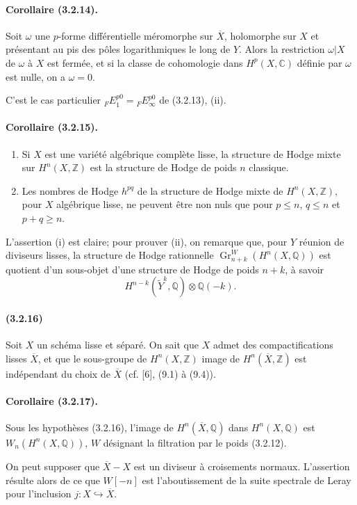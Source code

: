 \documentclass[10pt]{article}
\newcommand{\C}{\mathbb C}
\newcommand{\Q}{\mathbb Q}
\newcommand{\Z}{\mathbb Z}
\newcommand{\Gr}{\operatorname{Gr}}
\begin{document}
\paragraph{Corollaire (3.2.14).} Soit $\omega$ une $p$-forme différentielle méromorphe sur $\overline X$, holomorphe sur $X$ et présentant au pis des pôles logarithmiques le long de $Y$. Alors la restriction $\omega|X$ de $\omega$ à $X$ est fermée, et si la classe de cohomologie dans $H^p(X,\C)$ définie par $\omega$ est nulle, on a $\omega=0$.

C'est le cas particulier ${}_FE_1^{p0}={}_FE_\infty^{p0}$ de (3.2.13), (ii).

\paragraph{Corollaire (3.2.15).} 
\begin{enumerate}[label=(\roman*)]
\item Si $X$ est une variété algébrique complète lisse, la structure de Hodge mixte sur $H^n(X,\Z)$ est la structure de Hodge de poids $n$ classique.
\item Les nombres de Hodge $h^{pq}$ de la structure de Hodge mixte de $H^n(X,\Z)$, pour $X$ algébrique lisse, ne peuvent être non nuls que pour $p\le n$, $q\le n$ et $p+q\ge n$.
\end{enumerate}
L'assertion (i) est claire; pour prouver (ii), on remarque que, pour $Y$ réunion de diviseurs lisses, la structure de Hodge rationnelle $\Gr_{n+k}^W(H^n(X,\Q))$ est quotient d'un sous-objet d'une structure de Hodge de poids $n+k$, à savoir
\[
H^{n-k}(\widetilde Y^k,\Q)\otimes\Q(-k).
\]

\paragraph{(3.2.16)} Soit $X$ un schéma lisse et séparé. On sait que $X$ admet des compactifications lisses $\overline X$, et que le sous-groupe de $H^n(X,\Z)$ image de $H^n(\overline X,\Z)$ est indépendant du choix de $\overline X$ (cf. [6], (9.1) à (9.4)).

\paragraph{Corollaire (3.2.17).} Sous les hypothèses (3.2.16), l'image de $H^n(\overline X,\Q)$ dans $H^n(X,\Q)$ est $W_n(H^n(X,\Q))$, $W$ désignant la filtration par le poids (3.2.12).

On peut supposer que $\overline X-X$ est un diviseur à croisements normaux. L'assertion résulte alors de ce que $W[-n]$ est l'aboutissement de la suite spectrale de Leray pour l'inclusion $j:X\hookrightarrow\overline X$.
\end{document}
